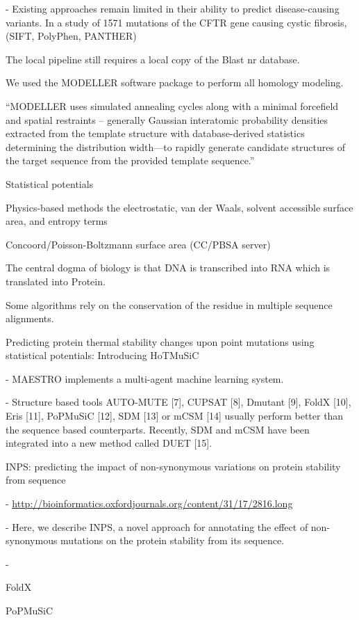 
- Existing approaches remain limited in their ability to predict disease-causing variants. In a study of 1571 mutations of the CFTR gene causing cystic fibrosis, (SIFT, PolyPhen, PANTHER) \cite{dorfman_common_2010}

The local pipeline still requires a local copy of the Blast nr database.

We used the MODELLER software package to perform all homology modeling.

``MODELLER uses simulated annealing cycles along with a minimal forcefield and spatial restraints -- generally Gaussian interatomic probability densities extracted from the template structure with database-derived statistics determining the distribution width—to rapidly generate candidate structures of the target sequence from the provided template sequence.''


Statistical potentials

Physics-based methods
the electrostatic, van der Waals, solvent accessible surface area, and entropy terms

Concoord/Poisson-Boltzmann surface area (CC/PBSA server)

The central dogma of biology is that DNA is transcribed into RNA which is translated into Protein.


Some algorithms rely on the conservation of the residue in multiple sequence alignments.

Predicting protein thermal stability changes upon point mutations using statistical potentials: Introducing HoTMuSiC

  - MAESTRO implements a multi-agent machine learning system.

  - Structure based tools AUTO-MUTE [7], CUPSAT [8], Dmutant [9], FoldX [10], Eris [11], PoPMuSiC [12], SDM [13] or mCSM [14] usually perform better than the sequence based counterparts. Recently, SDM and mCSM have been integrated into a new method called DUET [15].

INPS: predicting the impact of non-synonymous variations on protein stability from sequence

  - \url{http://bioinformatics.oxfordjournals.org/content/31/17/2816.long}

  - Here, we describe INPS, a novel approach for annotating the effect of non-synonymous mutations on the protein stability from its sequence.

  - \cite{fariselli_inps:_2015}

FoldX

PoPMuSiC

